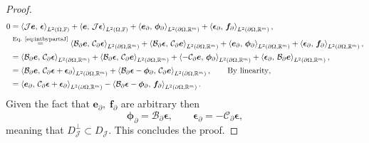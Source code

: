 \begin{proposition}
\begin{proof}
\begin{align*}
0&= \inner[L^2(\Omega, \bbF)]{\mathcal{J}\bm{e}}{\bm{\epsilon}} +\inner[L^2(\Omega, \bbF)]{\bm{e}}{\mathcal{J}\bm{\epsilon}} + \inner[L^2(\partial\Omega, \bbR^m)]{\bm{e}_{\partial}}{\bm{\phi}_{\partial}} +  \inner[L^2(\partial\Omega, \bbR^m)]{\bm{\epsilon}_{\partial}}{\bm{f}_{\partial}}, \\
&\stackrel{\text{Eq. \eqref{eq:intbypartsJ}}}{=} \inner[L^2(\partial\Omega, \bbR^m)]{\mathcal{B}_\partial \bm{e}}{\mathcal{C}_\partial \bm{\epsilon}} + \inner[L^2(\partial\Omega, \bbR^m)]{\mathcal{B}_\partial \bm{\epsilon}}{\mathcal{C}_\partial\bm{e}} + \inner[L^2(\partial\Omega, \bbR^m)]{\bm{e}_{\partial}}{\bm{\phi}_{\partial}} +  \inner[L^2(\partial\Omega, \bbR^m)]{\bm{\epsilon}_{\partial}}{\bm{f}_{\partial}}, \\
&= \inner[L^2(\partial\Omega, \bbR^m)]{\mathcal{B}_\partial \bm{e}}{\mathcal{C}_\partial \bm{\epsilon}} + \inner[L^2(\partial\Omega, \bbR^m)]{\mathcal{B}_\partial \bm{\epsilon}}{\mathcal{C}_\partial\bm{e}} + \inner[L^2(\partial\Omega, \bbR^m)]{-\mathcal{C}_\partial \bm{e}}{\bm{\phi}_{\partial}} +  \inner[L^2(\partial\Omega, \bbR^m)]{\bm{\epsilon}_{\partial}}{\mathcal{B}_\partial\bm{e}}, \\
&= \inner[L^2(\partial\Omega, \bbR^m)]{\mathcal{B}_\partial \bm{e}}{\mathcal{C}_\partial \bm{\epsilon} + \bm{\epsilon}_\partial} + \inner[L^2(\partial\Omega, \bbR^m)]{\mathcal{B}_\partial \bm{\epsilon} - \bm{\phi}_\partial}{\mathcal{C}_\partial\bm{e}}, \qquad \text{By linearity}, \\
&= \inner[L^2(\partial\Omega, \bbR^m)]{\bm{e}_\partial}{\mathcal{C}_\partial \bm{\epsilon} + \bm{\epsilon}_\partial} - \inner[L^2(\partial\Omega, \bbR^m)]{\mathcal{B}_\partial \bm{\epsilon} - \bm{\phi}_\partial}{\bm{f}_\partial}. \\
\end{align*}
Given the fact that $\bm{e}_\partial, \; \bm{f}_\partial$ are arbitrary then
\begin{equation*}
\bm{\phi}_{\partial} = \mathcal{B}_\partial \bm{\epsilon}, \qquad 
\bm{\epsilon}_{\partial} = -\mathcal{C}_\partial\bm{\epsilon},
\end{equation*}
meaning that ${D}_{\mathcal{J}}^\perp \subset {D}_{\mathcal{J}}$. This concludes the proof.
\end{proof}
\end{proposition}


